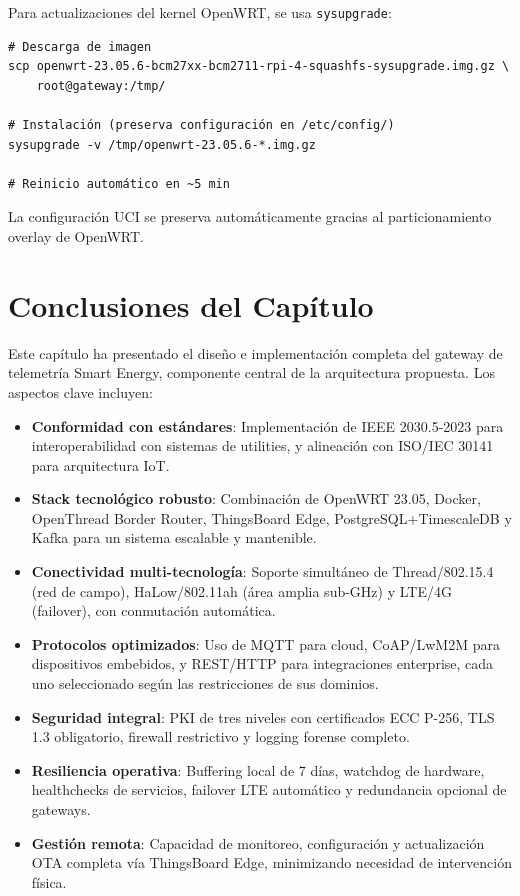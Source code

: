 Para actualizaciones del kernel OpenWRT, se usa \texttt{sysupgrade}:

\begin{verbatim}
# Descarga de imagen
scp openwrt-23.05.6-bcm27xx-bcm2711-rpi-4-squashfs-sysupgrade.img.gz \
    root@gateway:/tmp/

# Instalación (preserva configuración en /etc/config/)
sysupgrade -v /tmp/openwrt-23.05.6-*.img.gz

# Reinicio automático en ~5 min
\end{verbatim}

La configuración UCI se preserva automáticamente gracias al particionamiento overlay de OpenWRT.

\section{Conclusiones del Capítulo}

Este capítulo ha presentado el diseño e implementación completa del gateway de telemetría Smart Energy, componente central de la arquitectura propuesta. Los aspectos clave incluyen:

\begin{itemize}
    \item \textbf{Conformidad con estándares}: Implementación de IEEE 2030.5-2023 para interoperabilidad con sistemas de utilities, y alineación con ISO/IEC 30141 para arquitectura IoT.
    
    \item \textbf{Stack tecnológico robusto}: Combinación de OpenWRT 23.05, Docker, OpenThread Border Router, ThingsBoard Edge, PostgreSQL+TimescaleDB y Kafka para un sistema escalable y mantenible.
    
    \item \textbf{Conectividad multi-tecnología}: Soporte simultáneo de Thread/802.15.4 (red de campo), HaLow/802.11ah (área amplia sub-GHz) y LTE/4G (failover), con conmutación automática.
    
    \item \textbf{Protocolos optimizados}: Uso de MQTT para cloud, CoAP/LwM2M para dispositivos embebidos, y REST/HTTP para integraciones enterprise, cada uno seleccionado según las restricciones de sus dominios.
    
    \item \textbf{Seguridad integral}: PKI de tres niveles con certificados ECC P-256, TLS 1.3 obligatorio, firewall restrictivo y logging forense completo.
    
    \item \textbf{Resiliencia operativa}: Buffering local de 7 días, watchdog de hardware, healthchecks de servicios, failover LTE automático y redundancia opcional de gateways.
    
    \item \textbf{Gestión remota}: Capacidad de monitoreo, configuración y actualización OTA completa vía ThingsBoard Edge, minimizando necesidad de intervención física.
\end{itemize}

